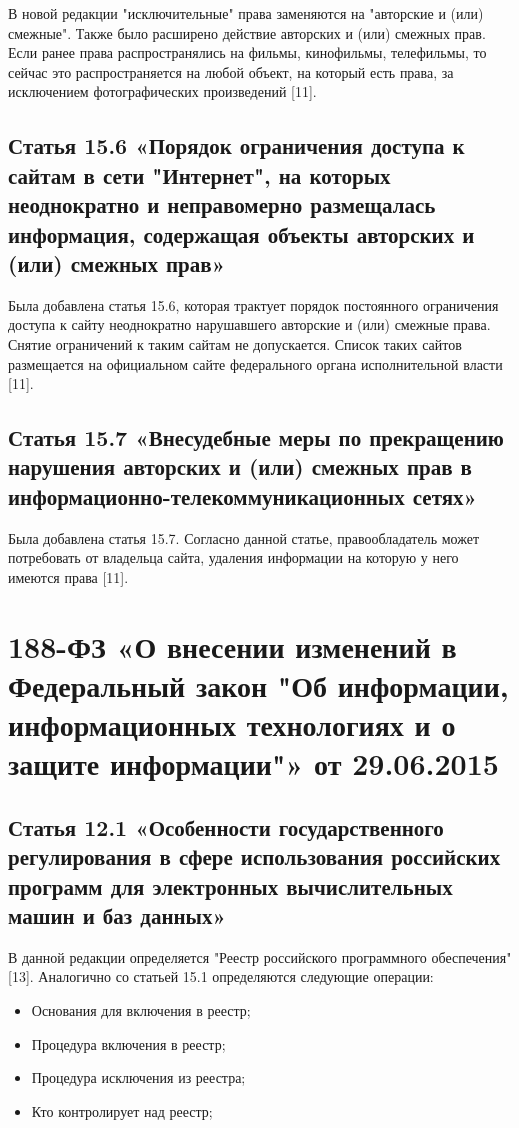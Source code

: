 \documentclass[14pt,a4paper,report]{article}
\begin{document}
В новой редакции "исключительные" права заменяются на "авторские и (или) смежные". Также было расширено действие авторских и (или) смежных прав. Если ранее права распространялись на фильмы, кинофильмы, телефильмы, то сейчас это распространяется на любой объект, на который есть права, за исключением фотографических произведений [11].

\subsection{Статья 15.6 «Порядок ограничения доступа к сайтам в сети "Интернет", на которых неоднократно и неправомерно размещалась информация, содержащая объекты авторских и (или) смежных прав»}

Была добавлена статья 15.6, которая трактует порядок постоянного ограничения доступа к сайту неоднократно нарушавшего авторские и (или) смежные права. Снятие ограничений к таким сайтам не допускается. Список таких сайтов размещается на официальном сайте федерального органа исполнительной власти [11].

\subsection{Статья 15.7 «Внесудебные меры по прекращению нарушения авторских и (или) смежных прав в информационно-телекоммуникационных сетях»}

Была добавлена статья 15.7. Согласно данной статье, правообладатель может потребовать от владельца сайта, удаления информации на которую у него имеются права [11].

\section{188-ФЗ «О внесении изменений в Федеральный закон "Об информации, информационных технологиях и о защите информации"» от 29.06.2015}

\subsection{Статья 12.1 «Особенности государственного регулирования в сфере использования российских программ для электронных вычислительных машин и баз данных»}

В данной редакции определяется "Реестр российского программного обеспечения" [13]. Аналогично со статьей 15.1 определяются следующие операции:

\begin{itemize}
	\item Основания для включения в реестр;
	\item Процедура включения в реестр;
	\item Процедура исключения из реестра;
	\item Кто контролирует над реестр;
\end{itemize}
\end{document}

